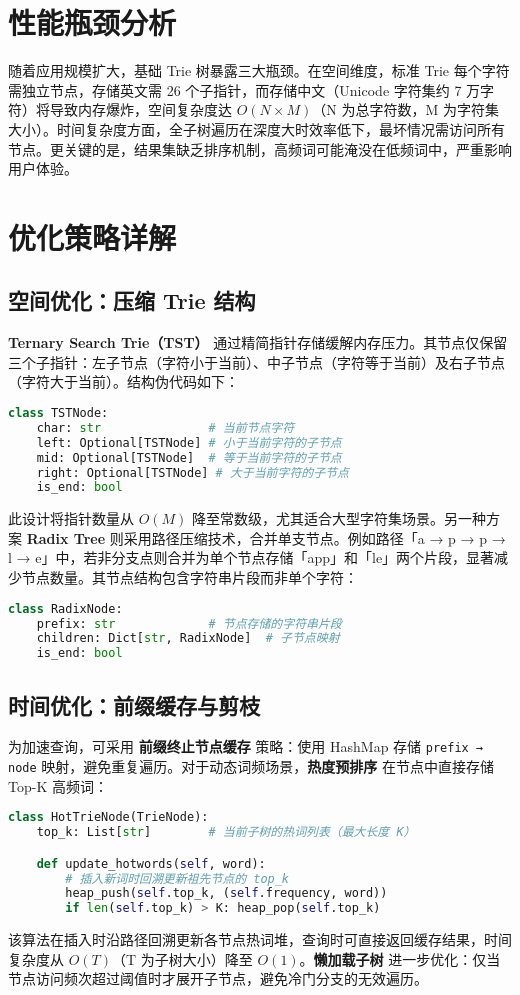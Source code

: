 \chapter{性能瓶颈分析}
随着应用规模扩大，基础 Trie 树暴露三大瓶颈。在空间维度，标准 Trie 每个字符需独立节点，存储英文需 26 个子指针，而存储中文（Unicode 字符集约 7 万字符）将导致内存爆炸，空间复杂度达 $O(N \times M)$（N 为总字符数，M 为字符集大小）。时间复杂度方面，全子树遍历在深度大时效率低下，最坏情况需访问所有节点。更关键的是，结果集缺乏排序机制，高频词可能淹没在低频词中，严重影响用户体验。\par
\chapter{优化策略详解}
\section{空间优化：压缩 Trie 结构}
\textbf{Ternary Search Trie（TST）} 通过精简指针存储缓解内存压力。其节点仅保留三个子指针：左子节点（字符小于当前）、中子节点（字符等于当前）及右子节点（字符大于当前）。结构伪代码如下：\par
\begin{lstlisting}[language=python]
class TSTNode:
    char: str               # 当前节点字符
    left: Optional[TSTNode] # 小于当前字符的子节点
    mid: Optional[TSTNode]  # 等于当前字符的子节点
    right: Optional[TSTNode] # 大于当前字符的子节点
    is_end: bool
\end{lstlisting}
此设计将指针数量从 $O(M)$ 降至常数级，尤其适合大型字符集场景。另一种方案 \textbf{Radix Tree} 则采用路径压缩技术，合并单支节点。例如路径「a → p → p → l → e」中，若非分支点则合并为单个节点存储「app」和「le」两个片段，显著减少节点数量。其节点结构包含字符串片段而非单个字符：\par
\begin{lstlisting}[language=python]
class RadixNode:
    prefix: str             # 节点存储的字符串片段
    children: Dict[str, RadixNode]  # 子节点映射
    is_end: bool
\end{lstlisting}
\section{时间优化：前缀缓存与剪枝}
为加速查询，可采用 \textbf{前缀终止节点缓存} 策略：使用 HashMap 存储 \texttt{prefix → node} 映射，避免重复遍历。对于动态词频场景，\textbf{热度预排序} 在节点中直接存储 Top-K 高频词：\par
\begin{lstlisting}[language=python]
class HotTrieNode(TrieNode):
    top_k: List[str]        # 当前子树的热词列表（最大长度 K）

    def update_hotwords(self, word):
        # 插入新词时回溯更新祖先节点的 top_k
        heap_push(self.top_k, (self.frequency, word)) 
        if len(self.top_k) > K: heap_pop(self.top_k)
\end{lstlisting}
该算法在插入时沿路径回溯更新各节点热词堆，查询时可直接返回缓存结果，时间复杂度从 $O(T)$（T 为子树大小）降至 $O(1)$。\textbf{懒加载子树} 进一步优化：仅当节点访问频次超过阈值时才展开子节点，避免冷门分支的无效遍历。\par
